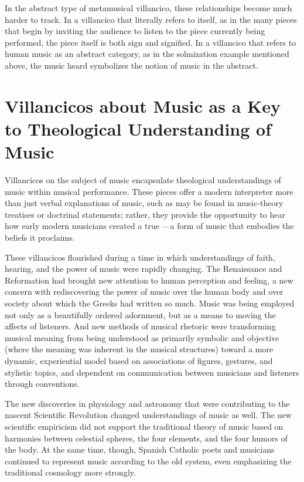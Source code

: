 In the abstract type of metamusical villancico, these relationships become much harder to track.
In a villancico that literally refers to itself, as in the many pieces that begin by inviting the audience to listen to the piece currently being performed, the piece itself is both sign and signified.
In a villancico that refers to human music as an abstract category, as in the solmization example mentioned above, the music heard symbolizes the notion of music in the abstract.



\section{%
Villancicos about Music as a Key to Theological Understanding of Music
}

Villancicos on the subject of music encapsulate theological understandings of music within musical performance.
These pieces offer a modern interpreter more than just verbal explanations of music, such as may be found in music-theory treatises or doctrinal statements; rather, they provide the opportunity to hear how early modern musicians created a true ---a form of music that embodies the beliefs it proclaims.

These villancicos flourished during a time in which understandings of faith, hearing, and the power of music were rapidly changing.
The Renaissance and Reformation had brought new attention to human perception and feeling, a new concern with rediscovering the power of music over the human body and over society about which the Greeks had written so much.
Music was being employed not only as a beautifully ordered adornment, but as a means to moving the affects of listeners.
And new methods of musical rhetoric were transforming musical meaning from being understood as primarily symbolic and objective (where the meaning was inherent in the musical structures) toward a more dynamic, experiential model based on associations of figures, gestures, and stylistic topics, and dependent on communication between musicians and listeners through conventions.

The new discoveries in physiology and astronomy that were contributing to the nascent Scientific Revolution changed understandings of music as well.%
	\autocite{Gouk:Sciences}
The new scientific empiricism did not support the traditional theory of music based on harmonies between celestial spheres, the four elements, and the four humors of the body.
At the same time, though, Spanish Catholic poets and musicians continued to represent music according to the old system, even emphasizing the traditional cosmology more strongly.

